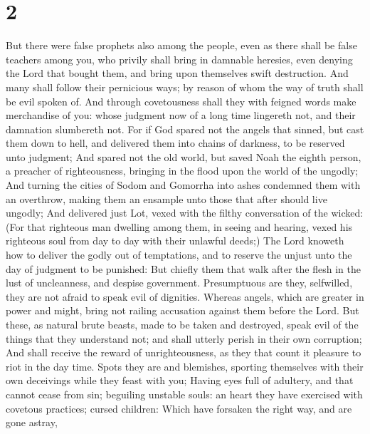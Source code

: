 \hypertarget{section-1}{%
\section{2}\label{section-1}}

 But there were false prophets also among the people, even
as there shall be false teachers among you, who privily shall bring in
damnable heresies, even denying the Lord that bought them, and bring
upon themselves swift destruction.  And many shall follow
their pernicious ways; by reason of whom the way of truth shall be evil
spoken of.  And through covetousness shall they with feigned
words make merchandise of you: whose judgment now of a long time
lingereth not, and their damnation slumbereth not.  For if
God spared not the angels that sinned, but cast them down to hell, and
delivered them into chains of darkness, to be reserved unto judgment;
 And spared not the old world, but saved Noah the eighth
person, a preacher of righteousness, bringing in the flood upon the
world of the ungodly;  And turning the cities of Sodom and
Gomorrha into ashes condemned them with an overthrow, making them an
ensample unto those that after should live ungodly;  And
delivered just Lot, vexed with the filthy conversation of the wicked:
 (For that righteous man dwelling among them, in seeing and
hearing, vexed his righteous soul from day to day with their unlawful
deeds;)  The Lord knoweth how to deliver the godly out of
temptations, and to reserve the unjust unto the day of judgment to be
punished:  But chiefly them that walk after the flesh in
the lust of uncleanness, and despise government. Presumptuous are they,
selfwilled, they are not afraid to speak evil of dignities.
 Whereas angels, which are greater in power and might,
bring not railing accusation against them before the Lord. 
But these, as natural brute beasts, made to be taken and destroyed,
speak evil of the things that they understand not; and shall utterly
perish in their own corruption;  And shall receive the
reward of unrighteousness, as they that count it pleasure to riot in the
day time. Spots they are and blemishes, sporting themselves with their
own deceivings while they feast with you;  Having eyes full
of adultery, and that cannot cease from sin; beguiling unstable souls:
an heart they have exercised with covetous practices; cursed children:
 Which have forsaken the right way, and are gone astray,
